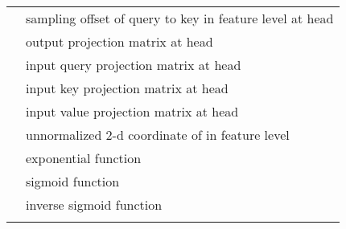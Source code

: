 \documentclass{article}
\begin{document}
\begin{table}[ht]
\begin{center}
\begin{tabular}{ll}
 & sampling offset of  query to  key in  feature level at  head \\
            & output projection matrix at  head \\
            & input query projection matrix at  head \\
            & input key projection matrix at  head \\
           & input value projection matrix at  head \\
& unnormalized 2-d coordinate of  in  feature level \\
             & exponential function \\
         & sigmoid function \\
    & inverse sigmoid function \\
\Xhline{2\arrayrulewidth}
\end{tabular}
\end{center}
\end{table}
 
\end{document}

